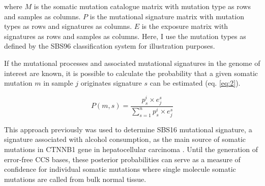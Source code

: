 where $M$ is the somatic mutation catalogue matrix with mutation type as rows and samples as columns. $P$ is the mutational signature matrix with mutation types as rows and signatures as columns. $E$ is the exposure matrix with signatures as rows and samples as columns. Here, I use the mutation types as defined by the SBS96 classification system for illustration purposes.

If the mutational processes and associated mutational signatures in the genome of interest are known, it is possible to calculate the probability that a given somatic mutation $m$ in sample $j$ originates signature $s$ can be estimated (eq. \ref{eq:2}). 

\begin{equation} \label{eq:2} 
P(m,s) = \frac{p^{i}_{s} \times e^{s}_{j}}{\sum^{n}_{s=1}p^{i}_{s} \times e^{s}_{j}}
\end{equation}

This approach previously was used to determine SBS16 mutational signature, a signature associated with alcohol consumption, as the main source of somatic mutations in CTNNB1 gene in hepatocellular carcinoma \cite{Letouze2017-tl}. Until the generation of error-free CCS bases, these posterior probabilities can serve as a measure of confidence for individual somatic mutations where single molecule somatic mutations are called from bulk normal tissue. 

%

